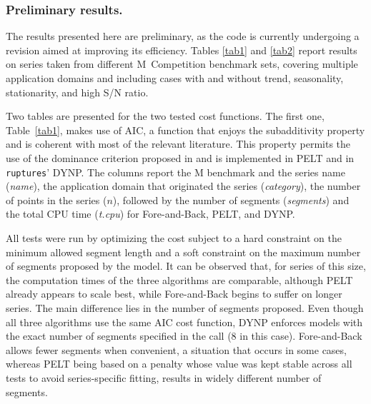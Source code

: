 \documentclass[runningheads]{llncs}
\begin{document}
\subsubsection{Preliminary results.}

The results presented here are preliminary, as the code is currently undergoing a revision aimed at improving its efficiency. Tables \ref{tab1} and \ref{tab2} report results on series taken from different M~Competition benchmark sets, covering multiple application domains and including cases with and without trend, seasonality, stationarity, and high S/N ratio.

Two tables are presented for the two tested cost functions. The first one, Table~\ref{tab1}, makes use of AIC, a function that enjoys the subadditivity property and is coherent with most of the relevant literature. This property permits the use of the dominance criterion proposed in \cite{KFE12} and is implemented in PELT and in \texttt{ruptures}' DYNP. The columns report the M benchmark and the series name ({\em name}), the application domain that originated the series ({\it category}), the number of points in the series ($n$), followed by the number of segments ({\it segments}) and the total CPU time ({\it t.cpu}) for Fore-and-Back, PELT, and DYNP.

All tests were run by optimizing the cost subject to a hard constraint on the minimum allowed segment length and a soft constraint on the maximum number of segments proposed by the model. It can be observed that, for series of this size, the computation times of the three algorithms are comparable, although PELT already appears to scale best, while Fore-and-Back begins to suffer on longer series. The main difference lies in the number of segments proposed. Even though all three algorithms use the same AIC cost function, DYNP enforces models with the exact number of segments specified in the call (8 in this case). Fore-and-Back allows fewer segments when convenient, a situation that occurs in some cases, whereas PELT being based on a penalty whose value was kept stable across all tests to avoid series-specific fitting, results in widely different number of segments.
\end{document}

